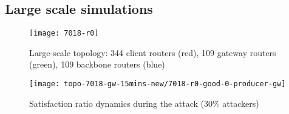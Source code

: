 \subsection{Large scale simulations}
\label{sec:largescale}

\begin{figure}[htbp]
  \centering
  \texttt{[image: 7018-r0]}
  \caption{Large-scale topology: 344 client routers (red), 109 gateway routers (green), 109 backbone routers (blue)}
  \label{fig:large-scale-topo}
\end{figure}


\begin{figure*}[t]
 \centering
 \texttt{[image: topo-7018-gw-15mins-new/7018-r0-good-0-producer-gw]}
 \caption{Satisfaction ratio dynamics during the attack (30\% attackers)}
 \label{fig:large-scale}
\end{figure*}




